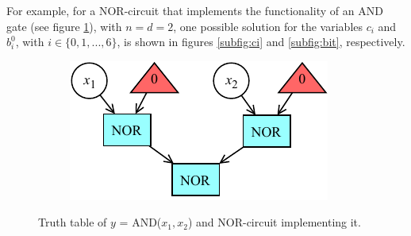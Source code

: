 \documentclass[letterpaper,10pt]{article}
\begin{document}
For example, for a NOR-circuit that implements the functionality of an AND gate (see figure \ref{fig:original}), with $n = d = 2$, one possible solution for the variables $c_i$ and $b_i^0$, with $i \in \{0,1,...,6\}$, is shown in figures \ref{subfig:ci} and \ref{subfig:bit}, respectively.
\begin{figure}[hbtp]
    \centering
    \begin{subfigure}[b]{0.45\textwidth}
    \end{subfigure}\hspace{-0.2\textwidth}
    \begin{subfigure}[b]{0.45\textwidth}
        \includegraphics[width=\textwidth]{circuit.pdf}  
    \end{subfigure}
    \caption{Truth table of $y$ = AND($x_1,x_2$) and NOR-circuit implementing it.}
    \label{fig:original}
\end{figure}
\end{document}
